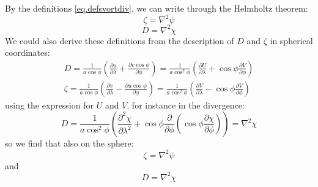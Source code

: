 By the definitions \ref{eq.defsvortdiv}, we can write through the Helmholtz theorem: 
 \begin{equation}\label{eq. vorticity}
    \zeta=\nabla^2\psi
\end{equation}
\begin{equation}\label{eq.divergence}
    D=\nabla^2\chi
\end{equation}
We could also derive these definitions from the description of $D$ and $\zeta$ in spherical coordinates:
\begin{align*}
    D=\frac{1}{a\cos\phi}\left(\frac{\partial u}{\partial\lambda}+\frac{\partial v\cos\phi}{\partial\phi}\right)=\frac{1}{a\cos^2\phi}\left(\frac{\partial U}{\partial\lambda}+\cos\phi\frac{\partial V}{\partial\phi}\right)\\
    \zeta= \frac{1}{a\cos\phi}\left(\frac{\partial v}{\partial\lambda}-\frac{\partial u\cos\phi}{\partial\phi}\right)=\frac{1}{a\cos^2\phi}\left(\frac{\partial V}{\partial\lambda}-\cos\phi\frac{\partial V}{\partial\phi}\right)
\end{align*}
using the expression for $U$ and $V$, for instance in the divergence:
\begin{equation}\label{eq.finitedivergence}
    D=\frac{1}{a\cos^2\phi}\left(\frac{\partial^2\chi}{\partial\lambda^2}+\cos\phi\frac{\partial}{\partial\phi}\left(\cos\phi\frac{\partial\chi}{\partial\phi}\right)\right)=\nabla^2\chi
\end{equation}
so we find that also on the sphere:
\begin{equation}\label{eq. vorticity}
    \zeta=\nabla^2\psi
\end{equation}
and 
\begin{equation}\label{eq.divergence}
    D=\nabla^2\chi
\end{equation}

